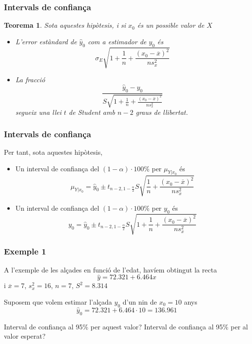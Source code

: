 \documentclass[12pt,t]{beamer}
\theoremstyle{plain}
\newtheorem{teorema}{Teorema}
\theoremstyle{definition}
\begin{document}
\begin{frame}
\frametitle{Intervals de confiança}
\begin{teorema}
Sota aquestes hipòtesis, i si $x_0$ és un possible valor de $X$
\begin{itemize}
\item L'error estàndard de $\widehat{y}_0$ com a estimador de $y_0$ és
$$
\sigma_E\sqrt{1+\frac{1}{n}+\frac{(x_0-\overline{x})^2}{ns^2_x}}
$$

\item La fracció
$$
\frac{\widehat{y}_0-y_0}{S\sqrt{1+\frac{1}{n}+\frac{(x_0-\overline{x})^2}{n
s^2_x}}}
$$
segueix una llei $t$ de Student amb $n-2$ graus de llibertat.
\end{itemize}
\end{teorema}
\end{frame}





\begin{frame}
\frametitle{Intervals de confiança}
Per tant, sota aquestes hipòtesis,
\begin{itemize}
\item Un interval de confiança del $(1-\alpha)\cdot 100\%$ per $\mu_{Y|x_0}$ és
$$
\mu_{Y|x_0}=\widehat{y}_0\pm t_{n-2,1-\frac{\alpha}{2}} S\sqrt{\frac{1}{n}+\frac{(x_0-\overline{x})^2}{n
s^2_x}}
$$

\item Un interval de confiança del $(1-\alpha)\cdot 100\%$ per $y_0$ és
$$
y_0=\widehat{y}_0\pm t_{n-2,1-\frac{\alpha}{2}} S\sqrt{1+\frac{1}{n}+\frac{(x_0-\overline{x})^2}{n
s^2_x}}
$$
\end{itemize}

\end{frame}



\begin{frame}
\frametitle{Exemple 1}
\vspace*{-2ex}

A l'exemple de les alçades en funció de l'edat, havíem obtingut la recta
$$
\widehat{y}=72.321+6.464x
$$
i $\overline{x}=7$, $s_x^2=16$, $n=7$, $S^2=8.314$
\medskip

Suposem que volem estimar l'alçada $y_0$ d'un nin de $x_0=10$ anys  
$$
\widehat{y}_0=72.321+6.464\cdot 10=136.961
$$

Interval de confiança al 95\% per aquest valor? Interval de confiança al 95\% per al valor esperat?
\end{frame}
\end{document}
